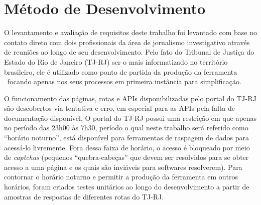\section{Método de Desenvolvimento}

O levantamento e avaliação de requisitos deste trabalho foi levantado com base
no contato direto com dois profissionais da área de jornalismo investigativo
através de reuniões ao longo de seu desenvolvimento. Pelo fato do Tribunal de
Justiça do Estado do Rio de Janeiro (TJ-RJ) ser o mais informatizado no
território brasileiro, ele é utilizado como ponto de partida da produção da
ferramenta \tjscraper~focando apenas nos seus processos em primeira instância
para simplificação.

O funcionamento das páginas, rotas e APIs disponibilizadas pelo portal do TJ-RJ
são descobertos via tentativa e erro, em especial para as APIs pela falta de
documentação disponível. O portal do TJ-RJ possui uma restrição em que apenas
no período das 23h00 às 7h30, período o qual neste trabalho será referido como
``horário noturno'', está disponível para ferramentas de raspagem de dados para
acessá-lo livremente. Fora dessa faixa de horário, o acesso é bloqueado por
meio de \textit{captchas} (pequenos ``quebra-cabeças'' que devem ser resolvidos
para se obter acesso a uma página e os quais são inviáveis para softwares
resolverem). Para contornar o horário noturno e permitir a produção da
ferramenta em outros horários, foram criados testes unitários ao longo do
desenvolvimento a partir de amostras de respostas de diferentes rotas do TJ-RJ.
